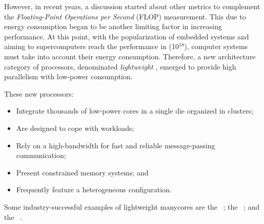     However, in recent years, a discussion started about other metrics to complement the \textit{Floating-Point Operations per Second} (FLOP) measurement.
    This due to energy consumption began to be another limiting factor in increasing performance.
    At this point, with the popularization of embedded systems and aiming to supercomputers reach the performance in \exascale (10$^{18}$), computer systems must take into account their energy consumption.
    Therefore, a new architecture category of processors, denominated \textit{lightweight} \manycores, emerged to provide high parallelism with low-power consumption.

    These new processors:
    \begin{itemize}
        \item Integrate thousands of low-power cores in a single die organized in clusters;
        \item Are designed to cope with \mimd workloads;
        \item Rely on a high-bandwidth \noc for fast and reliable message-passing communication;
        \item Present constrained memory systems; and
        \item Frequently feature a heterogeneous configuration.
    \end{itemize}
    Some industry-successful examples of lightweight manycores are
    the \mppa~\cite{DINECHIN20131654};
    the \epiphany~\cite{olofsson2014}; and
    the \taihulight~\cite{zheng2015}.

